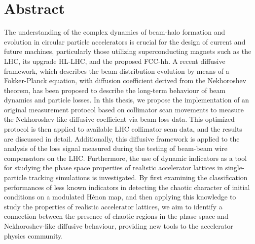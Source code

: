 \thispagestyle{empty}
\chapter*{Abstract} 

The understanding of the complex dynamics of beam-halo formation and evolution in circular particle accelerators is crucial for the design of current and future machines, particularly those utilizing superconducting magnets such as the LHC, its upgrade HL-LHC, and the proposed FCC-hh.
 A recent diffusive framework, which describes the beam distribution evolution by means of a Fokker-Planck equation, with diffusion coefficient derived from the Nekhoroshev theorem, has been proposed to describe the long-term behaviour of beam dynamics and particle losses.
 In this thesis, we propose the implementation of an original measurement protocol based on collimator scan movements to measure the Nekhoroshev-like diffusive coefficient via beam loss data.
 This optimized protocol is then applied to available LHC collimator scan data, and the results are discussed in detail.
 Additionally, this diffusive framework is applied to the analysis of the loss signal measured during the testing of beam-beam wire compensators on the LHC.
 Furthermore, the use of dynamic indicators as a tool for studying the phase space properties of realistic accelerator lattices in single-particle tracking simulations is investigated.
 By first examining the classification performances of less known indicators in detecting the chaotic character of initial conditions on a modulated Hénon map, and then applying this knowledge to study the properties of realistic accelerator lattices, we aim to identify a connection between the presence of chaotic regions in the phase space and Nekhoroshev-like diffusive behaviour, providing new tools to the accelerator physics community.



